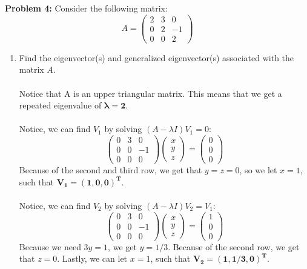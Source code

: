 \documentclass[11pt]{article}
\newenvironment{problem}[1]{\textbf{Problem #1: }}{\newpage}
\begin{document}
	\begin{problem}{4}
		Consider the following matrix:
		\[A = \begin{pmatrix}
			2 & 3 & 0 \\ 0 & 2 & -1 \\ 0 & 0 & 2
		\end{pmatrix}\]
		\begin{enumerate}[label = (\alph*)]
			\item  Find the eigenvector(s) and generalized eigenvector(s) associated with
			the matrix $A$.
			\\ \\
			Notice that A is an upper triangular matrix.  This means that we get a repeated eigenvalue of $\boldsymbol{\lambda = 2}$.
			\\ \\
			Notice, we can find $V_1$ by solving $(A - \lambda I)V_1 = 0$:
			\[\begin{pmatrix}
				0 & 3 & 0 \\ 0 & 0 & -1 \\ 0 & 0 & 0
			\end{pmatrix}\begin{pmatrix}
				x \\ y \\ z
			\end{pmatrix} = \begin{pmatrix}
				0 \\ 0 \\ 0
			\end{pmatrix}\]
			Because of the second and third row, we get that $y = z = 0$, so we let $x = 1$, such that $\boldsymbol{V_1 = (1, 0, 0)^T}$.
			\\ \\
			Notice, we can find $V_2$ by solving $(A - \lambda I)V_2 = V_1$:
			\[\begin{pmatrix}
				0 & 3 & 0 \\ 0 & 0 & -1 \\ 0 & 0 & 0
			\end{pmatrix}\begin{pmatrix}
				x \\ y \\ z
			\end{pmatrix} = \begin{pmatrix}
				1 \\ 0 \\ 0
			\end{pmatrix}\]
			Because we need $3y = 1$, we get $y = 1/3$.  Because of the second row, we get that $z = 0$.  Lastly, we can let $x = 1$, such that $\boldsymbol{V_2 = (1 , 1/3, 0)^T}$.

\end{enumerate}
\end{problem}
\end{document}
